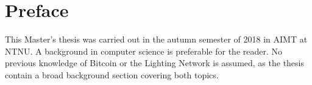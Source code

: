 \hypersetup{pageanchor=false}
%

\chapter*{Preface}
This Master's thesis was carried out in the autumn semester of 2018 in AIMT at NTNU. A background in computer science is preferable for the reader.
No previous knowledge of Bitcoin or the Lighting Network is assumed, as the thesis contain a broad background section covering both topics.

\thesisdate \\[1pc]
\\[1pc]
